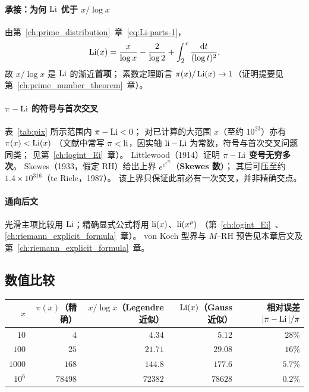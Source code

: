 \paragraph{承接：为何 $\operatorname{Li}$ 优于 $x/\log x$}
由第~\ref{ch:prime_distribution}~章~\eqref{eq:Li-parts-1}，
\[
  \operatorname{Li}(x)
  =\frac{x}{\log x}-\frac{2}{\log 2}
  +\int_2^x\frac{\mathrm{d}t}{(\log t)^{2}},
\]
故 $x/\log x$ 是 $\operatorname{Li}$ 的渐近\textbf{首项}；
素数定理断言 $\pi(x)/\operatorname{Li}(x)\to 1$（证明提要见第~\ref{ch:prime_number_theorem}~章）。

\paragraph{$\pi-\operatorname{Li}$ 的符号与首次交叉}
表~\ref{tab:pix} 所示范围内 $\pi-\operatorname{Li}<0$；
对已计算的大范围 $x$（至约 $10^{23}$）亦有 $\pi(x)<\operatorname{Li}(x)$
（文献中常写 $\pi<\operatorname{li}$，因实轴 $\operatorname{li}-\operatorname{Li}$ 为常数，符号与首次交叉问题同类；
见第~\ref{ch:logint_Ei}~章）。
Littlewood（1914）证明 $\pi-\operatorname{Li}$ \textbf{变号无穷多次}。
Skewes（1933，假定 RH）给出上界 $e^{e^{e^{79}}}$（\textbf{Skewes 数}）；
其后可压至约 $1.4\times 10^{316}$（te Riele，1987）。
该上界只保证此前必有一次交叉，并非精确交点。

\paragraph{通向后文}
光滑主项比较用 $\operatorname{Li}$；精确显式公式将用 $\operatorname{li}(x)$、$\operatorname{li}(x^{\rho})$
（第~\ref{ch:logint_Ei}~、\ref{ch:riemann_explicit_formula}~章）。
von Koch 型界与 $M$--RH 预告见本章后文及第~\ref{ch:riemann_explicit_formula}~章。

\subsection{数值比较}
 
\begin{center}
\setlength{\tabcolsep}{4.5pt}
\renewcommand{\arraystretch}{1.4}
\begin{tabular}{r|rrrr}
\toprule
$x$ & $\pi(x)$（精确） & $x/\log x$（Legendre 近似） & $\operatorname{Li}(x)$（Gauss 近似） & 相对误差 $|\pi-\operatorname{Li}|/\pi$ \\
\midrule
$10$ & $4$ & $4.34$ & $5.12$ & $28\%$ \\
$100$ & $25$ & $21.71$ & $29.08$ & $16\%$ \\
$1000$ & $168$ & $144.8$ & $177.6$ & $5.7\%$ \\
$10^6$ & $78498$ & $72382$ & $78628$ & $0.2\%$ \\
\bottomrule
\end{tabular}
\end{center}
 
